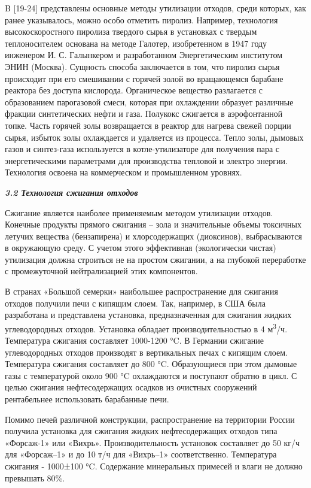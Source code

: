 \begin{multicols}{2}
B {[}19-24{]} представлены основные методы утилизации отходов, среди
которых, как ранее указывалось, можно особо отметить пиролиз. Например,
технология высокоскоростного пиролиза твердого сырья в установках с
твердым теплоносителем основана на методе Галотер, изобретенном в 1947
году инженером И. С. Галынкером и разработанном Энергетическим
институтом ЭНИН (Москва). Сущность способа заключается в том, что
пиролиз сырья происходит при его смешивании с горячей золой во
вращающемся барабане реактора без доступа кислорода. Органическое
вещество разлагается с образованием парогазовой смеси, которая при
охлаждении образует различные фракции синтетических нефти и газа.
Полукокс сжигается в аэрофонтанной топке. Часть горячей золы
возвращается в реактор для нагрева свежей порции сырья, избыток золы
охлаждается и удаляется из процесса. Тепло золы, дымовых газов и
синтез-газа используется в котле-утилизаторе для получения пара с
энергетическими параметрами для производства тепловой и электро энергии.
Технология освоена на коммерческом и промышленном уровнях.

\emph{{\bfseries 3.2 Технология сжигания отходов}}

Сжигание является наиболее применяемым методом утилизации отходов.
Конечные продукты прямого сжигания -- зола и значительные объемы
токсичных летучих вещества (бензапирена) и хлорсодержащих (диоксинов),
выбрасываются в окружающую среду. С учетом этого эффективная
(экологически чистая) утилизация должна строиться не на простом
сжигании, а на глубокой переработке с промежуточной нейтрализацией этих
компонентов.

В странах «Большой семерки» наибольшее распро­странение для сжигания
отходов получили печи с кипя­щим слоем. Так, например, в США была
разработана и представлена установка, предназначенная для сжигания
жидких углеводородных отходов. Установка обладает производительностью в
4 м\textsuperscript{3}/ч. Температура сжигания составля­ет 1000-1200 °C.
В Германии сжигание углеводородных отходов производят в вертикальных
печах с кипящим слоем. Температура сжигания составляет до 800 °C.
Образующиеся при этом дымовые газы с температурой около 900 °C
охлаждаются и поступают обратно в цикл. С целью сжигания нефтесодержащих
осадков из очистных сооружений рентабельнее использовать бара­банные
печи.

Помимо печей различной конструкции, распростра­нение на территории России
получила установка для сжигания жидких нефтесодержащих отхо­дов типа
«Форсаж-1» или «Вихрь». Производительность установок составляет до 50
кг/ч для «Форсаж--1» и до 10 т/ч для «Вихрь--1» соответственно.
Температура сжигания - 1000±100 °C. Содержание минеральных примесей и
влаги не должно превышать 80\%.


\end{multicols}
